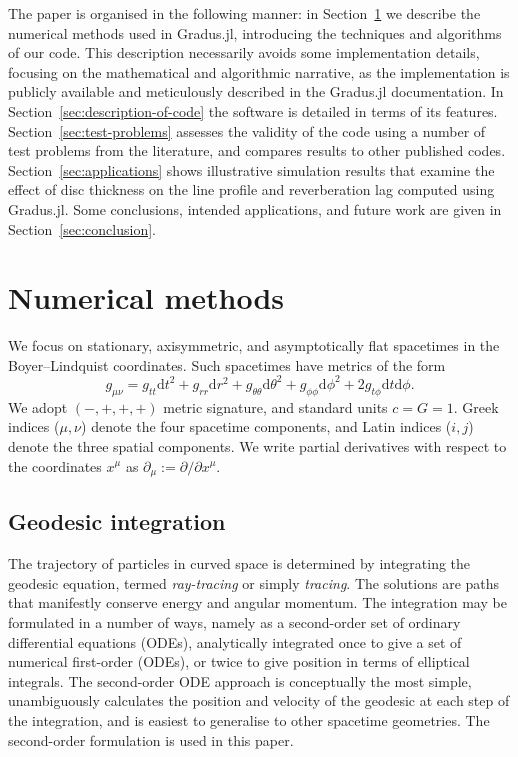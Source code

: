 \documentclass[fleqn,usenatbib]{mnras}
\newcommand{\software}[1]{{\sc #1}}
\newcommand{\Gradus}{\software{Gradus.jl}\xspace}
\renewcommand{\d}{\text{d}}
\begin{document}
The paper is organised in the following manner: in
Section~\ref{sec:numerical-methods} we describe the numerical methods used in
\Gradus, introducing the techniques and algorithms of our code. This description
necessarily avoids some implementation details, focusing on the mathematical and
algorithmic narrative, as the implementation is publicly available and
meticulously described in the \Gradus documentation. In
Section~\ref{sec:description-of-code} the software is detailed in terms of its
features. Section~\ref{sec:test-problems} assesses the validity of the code
using a number of test problems from the literature, and compares results to
other published codes.  Section~\ref{sec:applications} shows illustrative
simulation results that examine the effect of disc thickness on the line profile
and reverberation lag computed using \Gradus. Some conclusions, intended
applications, and future work are given in Section~\ref{sec:conclusion}.

\section{Numerical methods}
\label{sec:numerical-methods}

We focus on stationary, axisymmetric, and asymptotically flat spacetimes in the
Boyer--Lindquist coordinates. Such spacetimes have metrics of the form
\begin{equation}
\label{eq:stationary_axisymmetric_metric}
    g_{\mu\nu}
    = g_{tt} \d t^2
    + g_{rr} \d r^2
    + g_{\theta\theta} \d \theta^2
    + g_{\phi\phi} \d \phi^2
    + 2g_{t\phi} \d t \d \phi.
\end{equation}
We adopt $(-, +, +, +)$ metric signature, and standard units $c = G
= 1$. Greek indices ($\mu, \nu$) denote the four spacetime components, and Latin
indices ($i, j$) denote the three spatial components. We write partial
derivatives with respect to the coordinates $x^\mu$ as $\partial_\mu := \partial
/ \partial x^\mu$.

\subsection{Geodesic integration}

The trajectory of particles in curved space is determined by integrating the
geodesic equation, termed \emph{ray-tracing} or simply \emph{tracing}. The
solutions are paths that manifestly conserve energy and angular momentum. The
integration may be formulated in a number of ways, namely as a second-order set
of ordinary differential equations (ODEs), analytically integrated once to give
a set of numerical first-order (ODEs), or twice to give position in terms of
elliptical integrals. The second-order ODE approach is conceptually the most
simple, unambiguously calculates the position and velocity of the geodesic at
each step of the integration, and is easiest to generalise to other spacetime
geometries. The second-order formulation is used in this paper.
\end{document}
